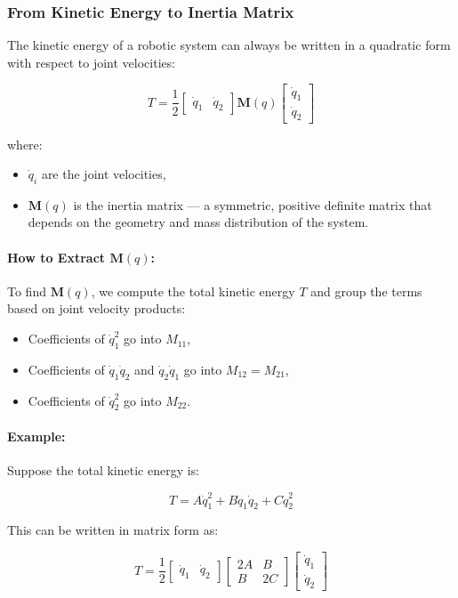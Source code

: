 \documentclass[a4paper,12pt]{article}
\begin{document}
\subsubsection*{From Kinetic Energy to Inertia Matrix}

The kinetic energy of a robotic system can always be written in a quadratic form with respect to joint velocities:

\[
T = \frac{1}{2}
\begin{bmatrix}
\dot{q}_1 & \dot{q}_2
\end{bmatrix}
\mathbf{M}(q)
\begin{bmatrix}
\dot{q}_1 \\
\dot{q}_2
\end{bmatrix}
\]

\noindent where:
\begin{itemize}
    \item $\dot{q}_i$ are the joint velocities,
    \item $\mathbf{M}(q)$ is the inertia matrix — a symmetric, positive definite matrix that depends on the geometry and mass distribution of the system.
\end{itemize}

\paragraph{How to Extract $\mathbf{M}(q)$:}
To find $\mathbf{M}(q)$, we compute the total kinetic energy $T$ and group the terms based on joint velocity products:
\begin{itemize}
    \item Coefficients of $\dot{q}_1^2$ go into $M_{11}$,
    \item Coefficients of $\dot{q}_1 \dot{q}_2$ and $\dot{q}_2 \dot{q}_1$ go into $M_{12} = M_{21}$,
    \item Coefficients of $\dot{q}_2^2$ go into $M_{22}$.
\end{itemize}

\paragraph{Example:}
Suppose the total kinetic energy is:

\[
T = A \dot{q}_1^2 + B \dot{q}_1 \dot{q}_2 + C \dot{q}_2^2
\]

\noindent This can be written in matrix form as:

\[
T = \frac{1}{2}
\begin{bmatrix}
\dot{q}_1 & \dot{q}_2
\end{bmatrix}
\begin{bmatrix}
2A & B \\
B & 2C
\end{bmatrix}
\begin{bmatrix}
\dot{q}_1 \\
\dot{q}_2
\end{bmatrix}
\]
\end{document}

